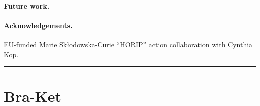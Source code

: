 \documentclass[letterpaper,11pt]{article}
\begin{document}
\paragraph*{Future work.} 


\paragraph*{Acknowledgements.} 

EU-funded Marie Skłodowska-Curie ``HORIP'' action collaboration with Cynthia Kop.






\hrule
\vspace*{1pc}

\appendix

\section{Bra-Ket}
\end{document}
